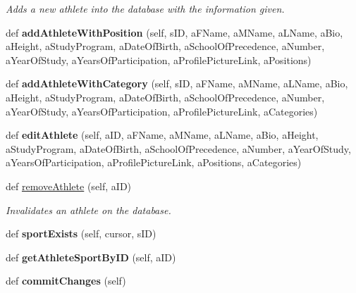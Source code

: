 \begin{DoxyCompactItemize}
\begin{DoxyCompactList}\small\item\em Adds a new athlete into the database with the information given. \end{DoxyCompactList}\item 
\mbox{\label{classhandler_1_1dao_1_1athlete__dao_1_1_athlete_d_a_o_a1fe64fa924a8b61d35696786f259c17f}} 
def {\bfseries add\+Athlete\+With\+Position} (self, s\+ID, a\+F\+Name, a\+M\+Name, a\+L\+Name, a\+Bio, a\+Height, a\+Study\+Program, a\+Date\+Of\+Birth, a\+School\+Of\+Precedence, a\+Number, a\+Year\+Of\+Study, a\+Years\+Of\+Participation, a\+Profile\+Picture\+Link, a\+Positions)
\item 
\mbox{\label{classhandler_1_1dao_1_1athlete__dao_1_1_athlete_d_a_o_a733537eff0206d83f15436b09704be45}} 
def {\bfseries add\+Athlete\+With\+Category} (self, s\+ID, a\+F\+Name, a\+M\+Name, a\+L\+Name, a\+Bio, a\+Height, a\+Study\+Program, a\+Date\+Of\+Birth, a\+School\+Of\+Precedence, a\+Number, a\+Year\+Of\+Study, a\+Years\+Of\+Participation, a\+Profile\+Picture\+Link, a\+Categories)
\item 
\mbox{\label{classhandler_1_1dao_1_1athlete__dao_1_1_athlete_d_a_o_a79d97bcfdc2ba5f68bfdf975f7c341b9}} 
def {\bfseries edit\+Athlete} (self, a\+ID, a\+F\+Name, a\+M\+Name, a\+L\+Name, a\+Bio, a\+Height, a\+Study\+Program, a\+Date\+Of\+Birth, a\+School\+Of\+Precedence, a\+Number, a\+Year\+Of\+Study, a\+Years\+Of\+Participation, a\+Profile\+Picture\+Link, a\+Positions, a\+Categories)
\item 
def \hyperlink{classhandler_1_1dao_1_1athlete__dao_1_1_athlete_d_a_o_a2677d09a6586e6742190c81270dc408a}{remove\+Athlete} (self, a\+ID)
\begin{DoxyCompactList}\small\item\em Invalidates an athlete on the database. \end{DoxyCompactList}\item 
\mbox{\label{classhandler_1_1dao_1_1athlete__dao_1_1_athlete_d_a_o_acf5929b8fe16451d4dad25146d93e426}} 
def {\bfseries sport\+Exists} (self, cursor, s\+ID)
\item 
\mbox{\label{classhandler_1_1dao_1_1athlete__dao_1_1_athlete_d_a_o_a95876679c31686ed6516687c82d3df6f}} 
def {\bfseries get\+Athlete\+Sport\+By\+ID} (self, a\+ID)
\item 
\mbox{\label{classhandler_1_1dao_1_1athlete__dao_1_1_athlete_d_a_o_ace87d62a49dc3b03b88d6ff8cf6b0210}} 
def {\bfseries commit\+Changes} (self)
\end{DoxyCompactItemize}
